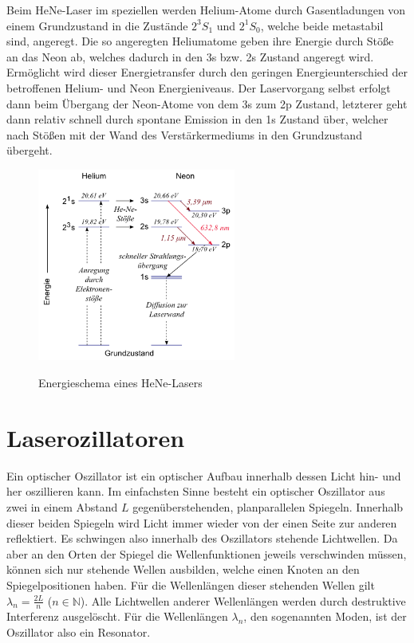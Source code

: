 \documentclass[bigchapter,colorback,accentcolor=tud4b,linedtoc,11pt]{tudreport}
\numberwithin{equation}{subsection}
\begin{document}
Beim HeNe-Laser im speziellen werden Helium-Atome durch Gasentladungen von einem Grundzustand in die Zustände $2^{3}S_{1}$ und $2^{1}S_{0}$, welche beide metastabil sind, angeregt. Die so angeregten Heliumatome geben ihre Energie durch Stöße an das Neon ab, welches dadurch in den 3s bzw. 2s Zustand angeregt wird. Ermöglicht wird dieser Energietransfer durch den geringen Energieunterschied der betroffenen Helium- und Neon Energieniveaus. Der Laservorgang selbst erfolgt dann beim Übergang der Neon-Atome von dem 3s zum 2p Zustand, letzterer geht dann relativ schnell durch spontane Emission in den 1s Zustand über, welcher nach Stößen mit der Wand des Verstärkermediums in den Grundzustand übergeht.

\begin{figure}[ht!]
\centering
\includegraphics[width=65mm]{img/5074.png}
\caption{Energieschema eines HeNe-Lasers}
\label{HeNeLaser}
\cite{HeNeNiveaus}
\end{figure}
\section{Laserozillatoren}
Ein optischer Oszillator ist ein optischer Aufbau innerhalb dessen Licht hin- und her oszillieren kann. Im einfachsten Sinne besteht ein optischer Oszillator aus zwei in einem Abstand \(L\) gegenüberstehenden, planparallelen Spiegeln. Innerhalb dieser beiden Spiegeln wird Licht immer wieder von der einen Seite zur anderen reflektiert. Es schwingen also innerhalb des Oszillators stehende Lichtwellen. Da aber an den Orten der Spiegel die Wellenfunktionen jeweils verschwinden müssen, können sich nur stehende Wellen ausbilden, welche einen Knoten an den Spiegelpositionen haben. Für die Wellenlängen dieser stehenden Wellen gilt \(\lambda_n = \frac{2L}{n}\) ($n \in \mathbb{N}$). Alle Lichtwellen anderer Wellenlängen werden durch destruktive Interferenz ausgelöscht. Für die Wellenlängen \(\lambda_n\), den sogenannten Moden, ist der Oszillator also ein Resonator.
\end{document}
